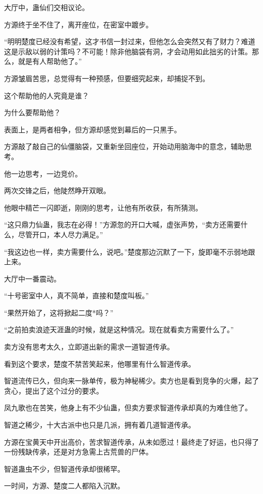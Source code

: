 \begin{this_body}
大厅中，蛊仙们交相议论。

方源终于坐不住了，离开座位，在密室中踱步。

“明明楚度已经没有希望，这才书信一封过来，但他怎么会突然又有了财力？难道这是示敌以弱的计策吗？不可能！除非他脑袋有洞，才会动用如此拙劣的计策。那么，就是有人帮助他了。”

方源皱眉苦思，总觉得有一种预感，但要细究起来，却捕捉不到。

这个帮助他的人究竟是谁？

为什么要帮助他？

表面上，是两者相争，但方源却感觉到幕后的一只黑手。

方源敲了敲自己的仙僵脑袋，又重新坐回座位，开始动用脑海中的意念，辅助思考。

他一边思考，一边竞价。

两次交锋之后，他陡然睁开双眼。

他眼中精芒一闪即逝，刚刚的思考，让他有所收获，有所猜测。

“这只鼎力仙蛊，我志在必得！”方源忽的开口大喊，虚张声势，“卖方还需要什么，尽管开口，本人尽力满足。”

“我这边也一样，卖方需要什么，说吧。”楚度那边沉默了一下，旋即毫不示弱地跟上来。

大厅中一番震动。

“十号密室中人，真不简单，直接和楚度叫板。”

“果然开始了，这将掀起二度*吗？”

“之前拍卖浪迹天涯蛊的时候，就是这种情况。现在就看卖方需要什么了。”

卖方没有思考太久，立即道出新的需求一道智道传承。

看到这个要求，楚度不禁苦笑起来，他哪里有什么智道传承。

智道流传已久，但向来一脉单传，极为神秘稀少。卖方也是看到竞争的火爆，起了贪心，提出了这个过分的要求。

凤九歌也在苦笑，他身上有不少仙蛊，但卖方要求智道传承却真的为难住他了。

智道之稀少，十大古派中也只是几派，拥有着几道智道传承。

方源在宝黄天中开出高价，苦求智道传承，从未如愿过！最终走了好运，也只得了一份残缺传承，还是对方急需上古荒兽的尸体。

智道蛊虫不少，但智道传承却很稀罕。

一时间，方源、楚度二人都陷入沉默。

\end{this_body}

